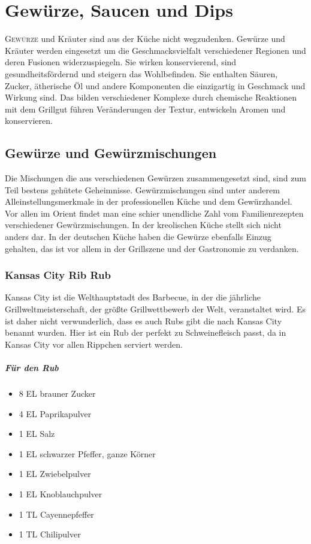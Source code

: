 \chapter{Gewürze, Saucen und Dips}\label{Chapter6}
\lettrine[lines=3]{G}{ewürze} und Kräuter sind aus der Küche nicht wegzudenken. 
Gewürze und Kräuter werden eingesetzt um die Geschmacksvielfalt verschiedener Regionen
und deren Fusionen widerzuspiegeln.
Sie wirken konservierend, sind gesundheitsfördernd und steigern das Wohlbefinden.
Sie enthalten Säuren, Zucker, ätherische Öl und andere Komponenten die einzigartig in
Geschmack und Wirkung sind. Das bilden verschiedener Komplexe durch chemische 
Reaktionen mit dem Grillgut führen Veränderungen der Textur, entwickeln Aromen
und konservieren.
   

\section{Gewürze und Gewürzmischungen}
Die Mischungen die aus verschiedenen Gewürzen zusammengesetzt sind, sind zum Teil
bestens gehütete Geheimnisse. Gewürzmischungen  sind unter anderem Alleinstellungsmerkmale
in der professionellen Küche und dem Gewürzhandel. Vor allen im Orient findet man eine schier
unendliche Zahl vom Familienrezepten verschiedener Gewürzmischungen. In der kreolischen Küche
stellt sich nicht anders dar.
In der deutschen Küche haben die Gewürze ebenfalls Einzug gehalten, das ist vor allem in der Grillszene und der Gastronomie zu 
verdanken.

\subsection{Kansas City Rib Rub}\label{Kansas}
Kansas City ist die Welthauptstadt des Barbecue, in der die jährliche 
Grillweltmeisterschaft, der größte Grillwettbewerb  der Welt,  veranstaltet wird. 
Es ist daher nicht verwunderlich, dass es auch Rubs gibt die nach Kansas City 
benannt wurden. Hier ist ein Rub der perfekt zu Schweinefleisch passt, da in 
Kansas City vor allen Rippchen serviert werden.
\paragraph{Für den Rub}

\begin{itemize}[noitemsep]
	\item 8 EL brauner Zucker
	\item 4 EL Paprikapulver
	\item 1 EL Salz
	\item 1 EL schwarzer Pfeffer, ganze Körner
	\item 1 EL Zwiebelpulver
	\item 1 EL Knoblauchpulver
	\item 1 TL Cayennepfeffer
	\item 1 TL Chilipulver
\end{itemize}

